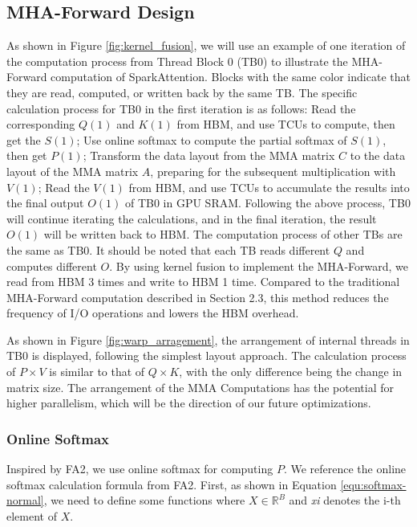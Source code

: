 \documentclass[10pt,twocolumn]{article}
\begin{document}
\subsection{MHA-Forward Design} \label{sec:forward_design}
As shown in Figure \ref{fig:kernel_fusion}, we will use an example of one iteration of the computation process from Thread Block 0 (TB0) to illustrate the MHA-Forward computation of SparkAttention.
Blocks with the same color indicate that they are read, computed, or written back by the same TB. 
The specific calculation process for TB0 in the first iteration is as follows: 
Read the corresponding $Q(1)$ and $K(1)$ from HBM, and use TCUs to compute, then get the $S(1)$; 
Use online softmax to compute the partial softmax of $S(1)$, then get $P(1)$;
Transform the data layout from the MMA matrix $C$ to the data layout of the MMA matrix $A$, preparing for the subsequent multiplication with $V(1)$; 
 Read the $V(1)$ from HBM, and use TCUs to accumulate the results into the final output $O(1)$ of TB0 in GPU SRAM. 
Following the above process, TB0 will continue iterating the calculations, and in the final iteration, the result $O(1)$ will be written back to HBM.
The computation process of other TBs are the same as TB0. 
It should be noted that each TB reads different $Q$ and computes different $O$.
By using kernel fusion to implement the MHA-Forward, we read from HBM 3 times and write to HBM 1 time. 
Compared to the traditional MHA-Forward computation described in Section 2.3, this method reduces the frequency of I/O operations and lowers the HBM overhead.

As shown in Figure \ref{fig:warp_arragement}, the arrangement of internal threads in TB0 is displayed, following the simplest layout approach. 
The calculation process of $P\times V$ is similar to that of $Q\times K$, with the only difference being the change in matrix size.
The arrangement of the MMA Computations has the potential for higher parallelism, which will be the direction of our future optimizations.

\subsubsection{Online Softmax} \label{sec:online_softmax}
Inspired by FA2, we use online softmax for computing $P$. 
We reference the online softmax calculation formula from FA2. 
First, as shown in Equation \ref{equ:softmax-normal}, we need to define some functions where $X \in \mathbb{R}^{B}$ and \textit{xi} denotes the i-th element of $X$.
\end{document}
